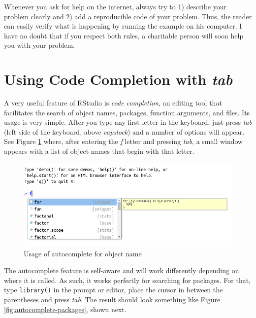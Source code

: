 \documentclass[
  12pt,
]{book}
\newenvironment{rmdcaution}
{\begin{cautionblock}
		
	} {\end{cautionblock}}
\begin{document}
\begin{rmdcaution}
Whenever you ask for help on the internet, always try to 1) describe
your problem clearly and 2) add a reproducible code of your problem.
Thus, the reader can easily verify what is happening by running the
example on his computer. I have no doubt that if you respect both rules,
a charitable person will soon help you with your problem.
\end{rmdcaution}

\hypertarget{autocomplete}{%
\section{\texorpdfstring{Using Code Completion with \emph{tab}}{Using Code Completion with tab}}\label{autocomplete}}

A very useful feature of RStudio is \emph{code completion}, an editing tool that facilitates the search of object names, packages, function arguments, and files. Its usage is very simple. After you type any first letter in the keyboard, just press \emph{tab} (left side of the keyboard, above \emph{capslock}) and a number of options will appear. See Figure \ref{fig:autocomplete-objects} where, after entering the \emph{f} letter and pressing \emph{tab}, a small window appears with a list of object names that begin with that letter. 

\begin{figure}[!htbp]

{\centering \includegraphics[width=1\linewidth]{figs/autocomplete_objects} 

}

\caption{Usage of autocomplete for object name}\label{fig:autocomplete-objects}
\end{figure}

The autocomplete feature is self-aware and will work differently depending on where it is called. As such, it works perfectly for searching for packages. For that, type \texttt{library()} in the prompt or editor, place the cursor in between the parentheses and press \emph{tab}. The result should look something like Figure \ref{fig:autocomplete-packages}, shown next.
\end{document}
